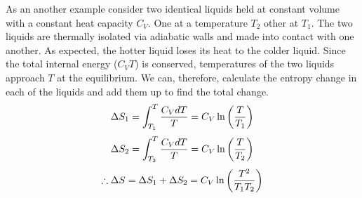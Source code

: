         As an another example consider two identical liquids held at constant volume with a constant heat capacity $C_V$. One at a temperature $T_2$ other at $T_1$. The two liquids are thermally isolated via adiabatic walls and made into contact with one another. As expected, the hotter liquid loses its heat to the colder liquid. Since the total internal energy ($C_VT$) is conserved, temperatures of the two liquids approach $T$ at the equilibrium. We can, therefore, calculate the entropy change in each of the liquids and add them up to find the total change. 
        \begin{equation}
            \Delta S_1 = \int_{T_1}^T\frac{C_VdT}{T} = C_V\ln\left( \frac{T}{T_1} \right)
        \end{equation}
        \begin{equation}
            \Delta S_2 = \int_{T_2}^T\frac{C_VdT}{T} = C_V\ln\left( \frac{T}{T_2} \right)
        \end{equation}
        \begin{equation}
            \therefore \Delta S = \Delta S_1 + \Delta S_2 = C_V\ln\left( \frac{T^2}{T_1T_2} \right)
        \end{equation}
\newpage
